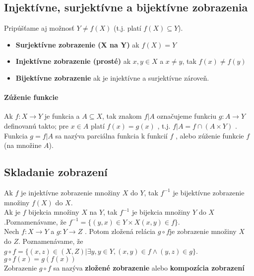 	\subsection{Injektívne, surjektívne a bijektívne zobrazenia}
		Pripúšťame aj možnosť $Y \neq f (X)$ (t.j. platí $f ( X ) \subseteq Y$).
		\begin{itemize}
			\item \textbf{Surjektívne zobrazenie (X na Y)} ak $f ( X ) = Y$
			\item \textbf{Injektívne zobrazenie (prosté)} ak $x, y \in X$ a $x \neq y$, tak $f ( x) \neq f ( y)$
			\item \textbf{Bijektívne zobrazenie} ak je injektívne a surjektívne zároveň.
		\end{itemize}

		\paragraph{Zúženie funkcie}
		Ak $f : X \rightarrow Y$ je funkcia a $A \subseteq X$, tak znakom $f | A$ označujeme funkciu $g : A \rightarrow Y$ definovanú takto; pre $x \in A$ platí $f (x) = g(x)$ , t.j. $f | A = f \cap ( A \times Y )$ . Funkcia $g = f | A$ sa nazýva parciálna funkcia k funkcií $f$ , alebo zúženie funkcie $f$ (na množine $A$).

	\subsection{Skladanie zobrazení}
		Ak $f$ je injektívne zobrazenie množiny $X$ do $Y$, tak $f^{-1}$ je bijektívne zobrazenie množiny $f ( X )$ do $X$.\\

		Ak je $f$ bijekcia množiny $X$ na $Y$, tak $f^{-1}$ je bijekcia množiny $Y$ do $X$.Poznamenávame, že $f^{-1} = \{(y, x) \in Y \times X ( x,  y) \in f \}$.\\

		Nech $f : X \rightarrow Y$ a $g :Y \rightarrow Z$ . Potom zložená relácia $g \circ f$je zobrazenie množiny $X$ do $Z$. Poznamenávame, že $g \circ f = \{( x, z) \in ( X , Z ) | \exists y, y \in Y, ( x, y ) \in f \wedge ( y, z) \in g\}$.\\

		$g \circ f(x) = g(f(x))$\\

		Zobrazenie $g \circ f$ sa nazýva \textbf{zložené zobrazenie} alebo \textbf{kompozícia zobrazení}\\


